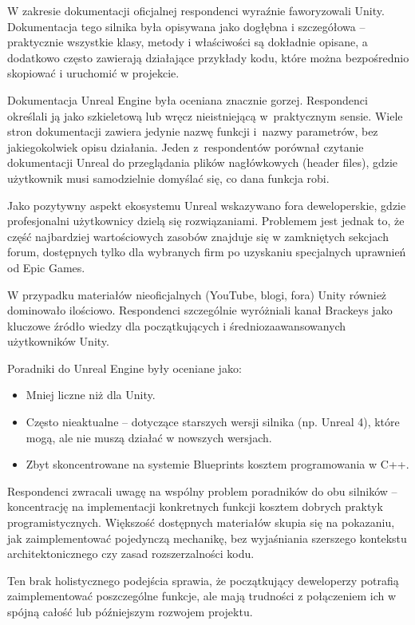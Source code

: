 W zakresie dokumentacji oficjalnej respondenci wyraźnie faworyzowali Unity. Dokumentacja tego silnika była opisywana jako dogłębna i szczegółowa -- praktycznie wszystkie klasy, metody i właściwości są dokładnie opisane, a dodatkowo często zawierają działające przykłady kodu, które można bezpośrednio skopiować i uruchomić w projekcie.

Dokumentacja Unreal Engine była oceniana znacznie gorzej. Respondenci
określali ją jako szkieletową lub wręcz nieistniejącą w~praktycznym
sensie. Wiele stron dokumentacji zawiera jedynie nazwę funkcji i~nazwy
parametrów, bez jakiegokolwiek opisu działania. Jeden z~respondentów
porównał czytanie dokumentacji Unreal do przeglądania plików
nagłówkowych (header files), gdzie użytkownik musi samodzielnie
domyślać się, co dana funkcja robi.

Jako pozytywny aspekt ekosystemu Unreal wskazywano fora deweloperskie, gdzie profesjonalni użytkownicy dzielą się rozwiązaniami. Problemem jest jednak to, że część najbardziej wartościowych zasobów znajduje się w zamkniętych sekcjach forum, dostępnych tylko dla wybranych firm po uzyskaniu specjalnych uprawnień od Epic Games.


W przypadku materiałów nieoficjalnych (YouTube, blogi, fora) Unity również dominowało ilościowo. Respondenci szczególnie wyróżniali kanał Brackeys jako kluczowe źródło wiedzy dla początkujących i średniozaawansowanych użytkowników Unity.

Poradniki do Unreal Engine były oceniane jako:
\begin{itemize}
    \item Mniej liczne niż dla Unity.
    \item Często nieaktualne -- dotyczące starszych wersji silnika (np. Unreal 4), które mogą, ale nie muszą działać w nowszych wersjach.
    \item Zbyt skoncentrowane na systemie Blueprints kosztem programowania w C++.
\end{itemize}


Respondenci zwracali uwagę na wspólny problem poradników do obu silników -- koncentrację na implementacji konkretnych funkcji kosztem dobrych praktyk programistycznych. Większość dostępnych materiałów skupia się na pokazaniu, jak zaimplementować pojedynczą mechanikę, bez wyjaśniania szerszego kontekstu architektonicznego czy zasad rozszerzalności kodu.

Ten brak holistycznego podejścia sprawia, że początkujący deweloperzy potrafią zaimplementować poszczególne funkcje, ale mają trudności z połączeniem ich w spójną całość lub późniejszym rozwojem projektu.

